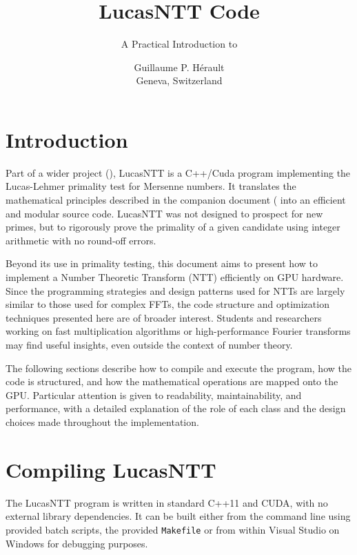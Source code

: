 \documentclass{article}
\subtitle{A Practical Introduction to}
\title{LucasNTT Code}
\author{
  Guillaume P. Hérault \\
  Geneva, Switzerland\\
}
\begin{document}
\maketitle
\theoremstyle{definition}



\section{Introduction}

Part of a wider project (\cite{LucasNTT}), LucasNTT is a C++/Cuda program implementing the Lucas-Lehmer primality test for Mersenne numbers. It translates the mathematical principles described in the companion document (\cite{LucasNTT_documents} into an efficient and modular source code. LucasNTT was not designed to prospect for new primes, but to rigorously prove the primality of a given candidate using integer arithmetic with no round-off errors.

Beyond its use in primality testing, this document aims to present how to implement a Number Theoretic Transform (NTT) efficiently on GPU hardware. Since the programming strategies and design patterns used for NTTs are largely similar to those used for complex FFTs, the code structure and optimization techniques presented here are of broader interest. Students and researchers working on fast multiplication algorithms or high-performance Fourier transforms may find useful insights, even outside the context of number theory.

The following sections describe how to compile and execute the program, how the code is structured, and how the mathematical operations are mapped onto the GPU. Particular attention is given to readability, maintainability, and performance, with a detailed explanation of the role of each class and the design choices made throughout the implementation.

\section{Compiling LucasNTT}
The LucasNTT program is written in standard C++11 and CUDA, with no external library dependencies. It can be built either from the command line using provided batch scripts, the provided \texttt{Makefile} or from within Visual Studio on Windows for debugging purposes.
\end{document}
